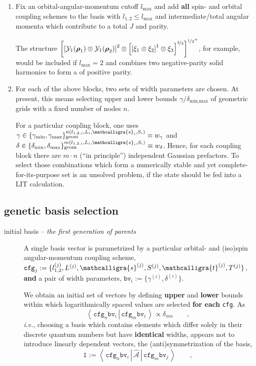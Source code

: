 \documentclass[onecolumn,preprint,superscriptaddress,nofootinbib,notitlepage,10pt,linenumbers]{revtex4-1}
\newcommand{\cfg}{\texttt{cfg}}
\newcommand{\bv}{\texttt{bv}}
\newcommand{\ie}{\textit{i.e.}\;}
\newcommand{\ve}[1]{\ensuremath{\boldsymbol{#1}}}
\newcommand{\overlap}[2] {\left\langle\,#1\,\left|\,#2\,\right.\right\rangle}
\newcommand{\me}[3] {\left\langle\,#1\,\left|\left.\,#2\,\right|\,#3\,\right.\right\rangle}
\begin{document}
\begin{enumerate}
\item Fix an orbital-angular-momentum cutoff $l_\text{max}$ and add {\bf all} spin- and orbital coupling schemes
to the basis with $l_{1,2}\leq l_\text{max}$ and intermediate/total angular momenta which contribute to a total $J$ and parity.

The structure $\left[\left[\mathcal{Y}_{1}(\ve{\rho}_1)\otimes\mathcal{Y}_{1}(\ve{\rho}_2)\right]^{2}\otimes
\left[\left[\xi_1\otimes\xi_2\right]^{1}\otimes\xi_3\right]^{\nicefrac{3}{2}}\right]^{\nicefrac{1}{2}^+}$, for example, would
be included if $l_\text{max}=2$ and combines two negative-parity solid harmonics to form a of positive parity.
\item For each of the above blocks, two sets of width parameters are chosen. At present, this means selecting upper and lower
bounds $\gamma/\delta_{\text{min,max}}$ of geometric grids with a fixed number of nodes $n$.

For a particular coupling block, one uses
\mbox{$\gamma\in\lbrace\gamma_\text{min},\gamma_\text{max}\rbrace^{n(l_{1,2,i},L_i,\mathcalligra{s}_i,S_i)}_\text{geom}\equiv w_\gamma$} and\\
\mbox{$\delta\in\lbrace\delta_\text{min},\delta_\text{max}\rbrace^{m(l_{1,2,i},L_i,\mathcalligra{s}_i,S_i)}_\text{geom}\equiv w_\delta$}.
Hence, for each coupling block there are $m\cdot n$ (``in principle'') independent Gaussian prefactors. To select those combinations
which form a numerically stable and yet complete-for-its-purpose set is an unsolved problem, if the state should be fed into a LIT
calculation.
\end{enumerate}

\newpage

\subsection*{genetic basis selection}

\begin{description}
  \item[initial basis -- {\it the first generation of parents}~]${}$\vspace{.2cm}\\
A single basis vector is parametrized by a particular orbital- and (iso)spin angular-momentum coupling scheme,
$\cfg_j:=\lbrace l^{(j)}_{1,2},L^{(j)},\mathcalligra{s}^{(j)},S^{(j)},\mathcalligra{t}^{(j)},T^{(j)}\rbrace$, {\bf and}
a pair of width parameters, $\bv_i:=\lbrace\gamma^{(i)},\delta^{(i)}\rbrace$.

We obtain an initial set of vectors by defining {\bf upper} and {\bf lower} bounds within which logarithmically spaced
values are selected {\bf for each} \cfg. As $$\overlap{\cfg_n\bv_i}{\cfg_m\bv_i}\propto\delta_{mn}\qquad,$$
\ie, choosing a basis which contains elements which differ solely in their discrete quantum numbers but have {\bf identical}
widths, appears not to introduce linearly dependent vectors, the (anti)symmetrization of the basis,
$$\mathbb{1}:=\me{\cfg_n\bv_i}{\mathcal{\hat{A}}}{\cfg_m\bv_j}\qquad,$$

\end{description}
\end{document}
